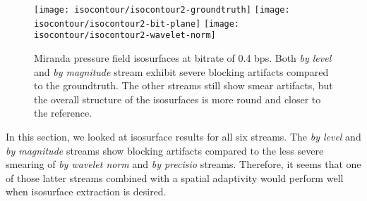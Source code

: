\begin{figure}[t]
	\centering
	{\texttt{[image: isocontour/isocontour2-groundtruth]}}
	{\texttt{[image: isocontour/isocontour2-bit-plane]}}
	{\texttt{[image: isocontour/isocontour2-wavelet-norm]}}
	\caption{Miranda pressure field isosurfaces at bitrate of 0.4 bps. Both {\em by level}
        and {\em by magnitude} stream exhibit severe blocking artifacts compared to the groundtruth.
        The other streams still show smear artifacts, but the overall structure of the isosurfaces
        is more round and closer to the reference.}
	\label{fig:isocontour-surfaces}
\end{figure}


In this section, we looked at isosurface results for all six streams. The {\em by level} and {\em by
magnitude} streams show blocking artifacts compared to the less severe smearing of {\em by wavelet
norm} and {\em by precisio} streams. Therefore, it seems that one of those latter streams combined
with a spatial adaptivity would perform well when isosurface extraction is desired.
